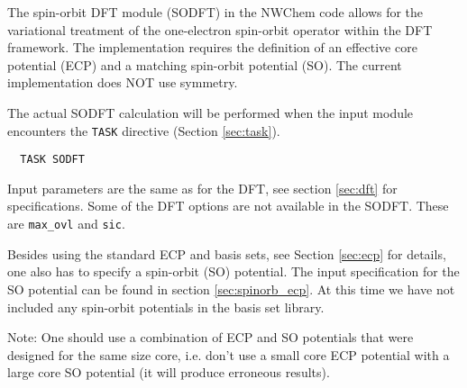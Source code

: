 \label{sec:sodft}


The spin-orbit DFT module (SODFT) in the NWChem code allows for the variational treatment
of the one-electron spin-orbit operator within the DFT framework. The implementation 
requires the definition of an effective core potential (ECP) and a matching spin-orbit
potential (SO). The current implementation does NOT use symmetry. 

The actual SODFT calculation will be performed when the input module
encounters the \verb+TASK+ directive (Section \ref{sec:task}).  

\begin{verbatim}
  TASK SODFT
\end{verbatim}

Input parameters are the same as for the DFT, see section \ref{sec:dft} for specifications. 
Some of the DFT options are not available in the SODFT. These are \verb+max_ovl+ and 
\verb+sic+.

Besides using the standard ECP and basis sets, see Section \ref{sec:ecp} for details, one 
also has to specify a spin-orbit (SO) potential. The input specification for the SO potential
can be found in section \ref{sec:spinorb_ecp}. At this time we have not included any spin-orbit
potentials in the basis set library.

Note: One should use a combination of ECP and SO potentials that were designed for the same 
size core, i.e. don't use a small core ECP potential with a large core SO potential (it will
produce erroneous results).
